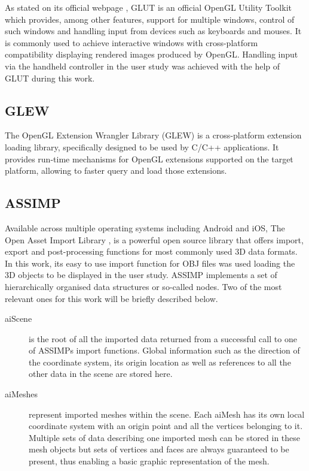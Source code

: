 As stated on its official webpage \cite{GLUT}, GLUT is an official OpenGL Utility Toolkit which provides, among other features, support for multiple windows, control of such windows and handling input from devices such as keyboards and mouses. It is commonly used to achieve interactive windows with cross-platform compatibility displaying rendered images produced by OpenGL. Handling input via the handheld controller in the user study was achieved with the help of GLUT during this work.

\subsection{GLEW}
\label{sec:glew}

The OpenGL Extension Wrangler Library (GLEW)\cite{GLEW} is a cross-platform extension loading library, specifically designed to be used by C/C++ applications. It provides run-time mechanisms for OpenGL extensions supported on the target platform, allowing to faster query and load those extensions.

\subsection{ASSIMP}
\label{sec:assimp}

Available across multiple operating systems including Android and iOS, The Open Asset Import Library \cite{ASP}, is a powerful open source library that offers import, export and post-processing functions for most commonly used 3D data formats. In this work, its easy to use import function for OBJ files was used loading the 3D objects to be displayed in the user study. ASSIMP implements a set of hierarchically organised data structures or so-called nodes. Two of the most relevant ones for this work will be briefly described below.

\begin{description}
	\item[aiScene] is the root of all the imported data returned from a successful call to one of ASSIMPs import functions. Global information such as the direction of the coordinate system, its origin location as well as references to all the other data in the scene are stored here.
	\item[aiMeshes] represent imported meshes within the scene. Each aiMesh has its own local coordinate system with an origin point and all the vertices belonging to it. Multiple sets of data describing one imported mesh can be stored in these mesh objects but sets of vertices and faces are always guaranteed to be present, thus enabling a basic graphic representation of the mesh.
\end{description}

